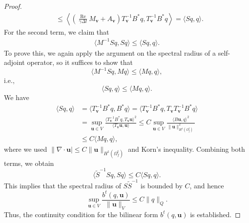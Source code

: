 \documentclass[10pt,a4paper]{amsart}
\newcommand{\Reynolds}{{\operatorname{Re}}}
\newcommand{\bu}{{\mathbf{u}}}
\newcommand{\bv}{{\mathbf{v}}}
\begin{document}
\begin{proof}
\begin{equation}
\begin{aligned}
        &\leq \left\langle \left( \frac{\Reynolds}{\gamma\Delta t} M_\bv + A_\bv \right) T_\bv^{-1} B^* q, T_\bv^{-1} B^* q \right\rangle 
         = \langle S q, q \rangle.
    \end{aligned}
\end{equation}
For the second term, we claim that
\begin{equation}
    \begin{aligned}
        \langle M^{-1} S q, S q \rangle \leq \langle S q, q \rangle.
    \end{aligned}
\end{equation}
To prove this, we again apply the argument on the spectral radius of a self-adjoint operator, so it suffices to show that
\begin{equation}
    \langle M^{-1} S q, M q \rangle \leq \langle M q, q \rangle,
\end{equation}
i.e.,
\begin{equation} 
    \langle S q, q \rangle \leq \langle M q, q \rangle.
\end{equation}
We have
\begin{equation}
    \begin{aligned}
        \langle S q, q \rangle 
        &= \langle T_\bv^{-1} B^* q, B^* q \rangle 
         = \langle T_\bv^{-1} B^* q, T_\bv T_\bv^{-1} B^* q \rangle \\
        &= \sup_{\bu \in V} \frac{\langle T_\bv^{-1} B^* q, T_\bv \bu \rangle^2}{\langle T_\bv \bu, \bu \rangle} 
         \leq C \sup_{\bu \in V} \frac{\langle B \bu, q \rangle^2}{\|\bu\|_{H^1(\Omega_f^t)}^2} \\
        &\leq C \langle M q, q \rangle,
    \end{aligned} 
\end{equation}
where we used $\|\nabla \cdot \bu| \leq C \|\bu\|_{H^1(\Omega_f^t)}$ and Korn's inequality. Combining both terms, we obtain
\begin{equation}
    \langle \tilde{S}^{-1} S q, S q \rangle \leq C \langle S q, q \rangle.
\end{equation}
This implies that the spectral radius of $S \tilde{S}^{-1}$ is bounded by $C$, and hence
\begin{equation}
    \sup_{\bu \in V} \frac{b^t(q, \bu)}{\|\bu\|_V} \leq C \|q\|_Q.
\end{equation}
Thus, the continuity condition for the bilinear form $b^t(q, \bu)$ is established.
\end{proof}
\end{document}

